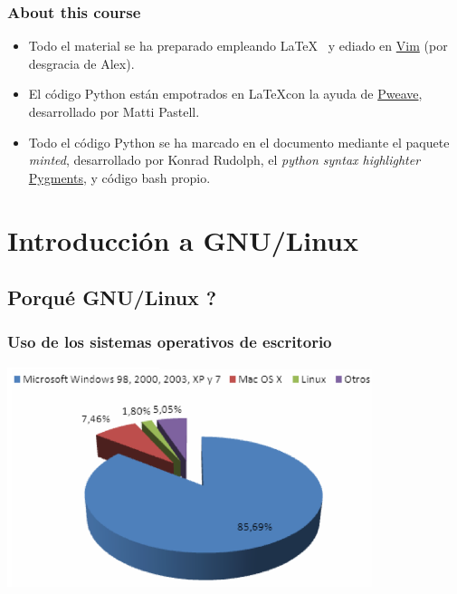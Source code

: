 \documentclass[colorlinks,10pt]{beamer}
\begin{document}
\begin{frame}[fragile]\frametitle{About this course}
\begin{block}{}


    \begin{itemize}
        \item Todo el material se ha preparado empleando \LaTeX~ y ediado en  \href{http://www.vim.org}{Vim} (por desgracia de  Alex).
        \item El código Python están empotrados en  \LaTeX con la ayuda de  \href{http://mpastell.com/pweave/}{Pweave}, desarrollado por  Matti Pastell. 
        \item Todo el código Python se ha marcado en el documento mediante el paquete  \emph{minted}, desarrollado por Konrad Rudolph, el \emph{python syntax highlighter} \href{http://pygments.org}{Pygments}, y código bash propio. 
    \end{itemize}
    \end{block}

\end{frame}


\section{Introducción a GNU/Linux}

\subsection{Porqué GNU/Linux ?}


\begin{frame}
  \frametitle{Uso de los sistemas operativos de escritorio}
  
  \begin{center}
    \includegraphics[width=0.8\textwidth]{figs/SOSdesktop}
  \end{center}
\end{frame}
\end{document}
